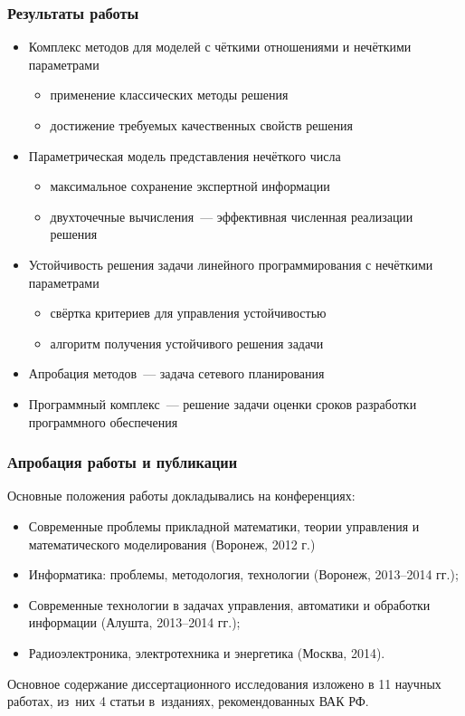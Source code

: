 \documentclass[12pt]{beamer}
\begin{document}
\begin{frame}
  \frametitle{Результаты работы}
  \begin{itemize}
    \item Комплекс методов для моделей с чёткими отношениями и нечёткими параметрами
    \begin{itemize}
      \item применение классических методы решения
      \item достижение требуемых качественных свойств решения
    \end{itemize}
    \item Параметрическая модель представления нечёткого числа
    \begin{itemize}
      \item максимальное сохранение экспертной информации
      \item двухточечные вычисления~--- эффективная численная реализации решения
    \end{itemize}
    \item Устойчивость решения задачи линейного программирования с нечёткими параметрами
    \begin{itemize}
      \item свёртка критериев для управления устойчивостью
      \item алгоритм получения устойчивого решения задачи
    \end{itemize}
    \item Апробация методов~--- задача сетевого планирования
    \item Программный комплекс~--- решение задачи оценки сроков разработки программного обеспечения
  \end{itemize}
\end{frame}

\begin{frame}
  \frametitle{Апробация работы и публикации}
  Основные положения работы докладывались на конференциях:
  \begin{itemize}
    \item Современные проблемы прикладной математики, теории управления и математического моделирования (Воронеж, 2012 г.)
    \item Информатика: проблемы, методология, технологии (Воронеж, 2013--2014 гг.);
    \item Современные технологии в задачах управления, автоматики и обработки информации (Алушта, 2013--2014 гг.);
    \item Радиоэлектроника, электротехника и энергетика (Москва, 2014).
  \end{itemize}
  Основное содержание диссертационного исследования изложено в 11 научных работах, из~них 4 статьи в~изданиях, рекомендованных ВАК РФ.
\end{frame}
\end{document}

